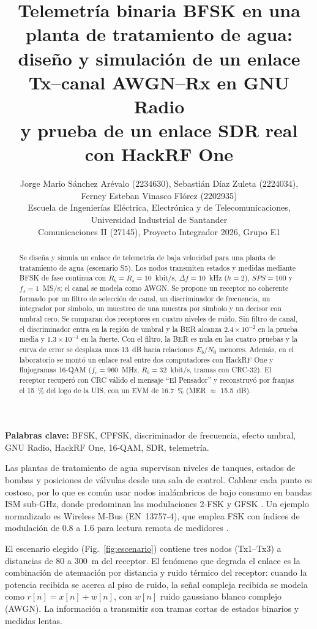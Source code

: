 \documentclass[10pt,twocolumn,letterpaper]{article}
\title{\Large Telemetría binaria BFSK en una planta de tratamiento de agua:\\ diseño y simulación de un enlace Tx--canal AWGN--Rx en GNU Radio\\ y prueba de un enlace SDR real con HackRF One}
\author{Jorge Mario Sánchez Arévalo (2234630), Sebastián Díaz Zuleta (2224034),\\ Ferney Esteban Vinasco Flórez (2202935)\\
\small Escuela de Ingenierías Eléctrica, Electrónica y de Telecomunicaciones, Universidad Industrial de Santander\\
\small Comunicaciones II (27145), Proyecto Integrador 2026, Grupo E1}
\date{}
\makeatletter
\renewcommand\section{\@startsection{section}{1}{\z@}{-1.5ex plus -.5ex minus -.2ex}{0.8ex}{\centering\normalfont\scshape}}
\makeatother
\begin{document}
\maketitle

\begin{abstract}
\noindent Se diseña y simula un enlace de telemetría de baja velocidad para una planta de tratamiento de agua (escenario S5). Los nodos transmiten estados y medidas mediante BFSK de fase continua con $R_b=R_s=10$~kbit/s, $\Delta f=10$~kHz ($h=2$), $SPS=100$ y $f_s=1$~MS/s; el canal se modela como AWGN. Se propone un receptor no coherente formado por un filtro de selección de canal, un discriminador de frecuencia, un integrador por símbolo, un muestreo de una muestra por símbolo y un decisor con umbral cero. Se comparan dos receptores en cuatro niveles de ruido. Sin filtro de canal, el discriminador entra en la región de umbral y la BER alcanza $2.4\times10^{-2}$ en la prueba media y $1.3\times10^{-1}$ en la fuerte. Con el filtro, la BER es nula en las cuatro pruebas y la curva de error se desplaza unos 13~dB hacia relaciones $E_b/N_0$ menores. Además, en el laboratorio se montó un enlace real entre dos computadores con HackRF One y flujogramas 16-QAM ($f_c=960$~MHz, $R_b=32$~kbit/s, tramas con CRC-32). El receptor recuperó con CRC válido el mensaje ``El Pensador'' y reconstruyó por franjas el 15~\% del logo de la UIS, con un EVM de 16.7~\% (MER $\approx$ 15.5~dB).
\end{abstract}

\noindent\textbf{\small Palabras clave:} \small BFSK, CPFSK, discriminador de frecuencia, efecto umbral, GNU Radio, HackRF One, 16-QAM, SDR, telemetría.\normalsize

\section{Introducción y escenario}
Las plantas de tratamiento de agua supervisan niveles de tanques, estados de bombas y posiciones de válvulas desde una sala de control. Cablear cada punto es costoso, por lo que es común usar nodos inalámbricos de bajo consumo en bandas ISM sub-GHz, donde predominan las modulaciones 2-FSK y GFSK \cite{st_subghz}. Un ejemplo normalizado es Wireless M-Bus (EN~13757-4), que emplea FSK con índices de modulación de 0.8 a 1.6 para lectura remota de medidores \cite{an0987}.

El escenario elegido (Fig.~\ref{fig:escenario}) contiene tres nodos (Tx1--Tx3) a distancias de 80 a 300~m del receptor. El fenómeno que degrada el enlace es la combinación de atenuación por distancia y ruido térmico del receptor: cuando la potencia recibida se acerca al piso de ruido, la señal compleja recibida se modela como $r[n]=x[n]+w[n]$, con $w[n]$ ruido gaussiano blanco complejo (AWGN). La información a transmitir son tramas cortas de estados binarios y medidas lentas.
\end{document}

